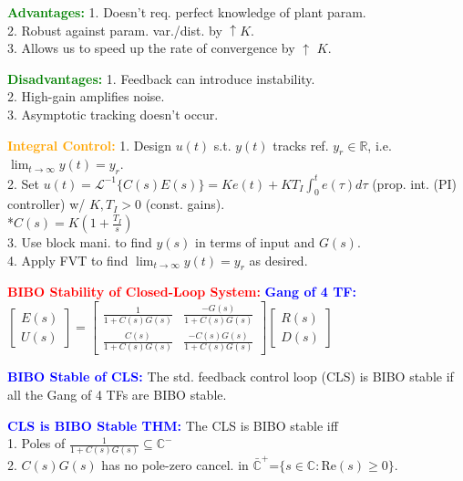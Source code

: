 \documentclass[5pt]{extarticle} %
\begin{document}
\begin{paracol}{3}
{    \textcolor{green}{\textbf{Advantages:}} 1. Doesn't req. perfect knowledge of plant param. \\
    2. Robust against param. var./dist. by $\uparrow K$. \\
    3. Allows us to speed up the rate of convergence by $\uparrow$ $K$.

    \textcolor{green}{\textbf{Disadvantages:}} 1. Feedback can introduce instability. \\
    2. High-gain amplifies noise. \\
    3. Asymptotic tracking doesn't occur. 

    \textcolor{orange}{\textbf{Integral Control:}} 1. Design $u(t)$ s.t. $y(t)$ tracks ref. $y_r \in \mathbb{R}$, i.e. $\lim_{t \rightarrow \infty} y(t) = y_r$. \\
    2. Set $u(t) = \mathcal{L}^{-1} \{C(s)E(s)\} = K e(t) + K T_I \int_0^t e(\tau) d\tau$ (prop. int. (PI) controller) w/ $K, T_I > 0$ (const. gains). \\
    *$C(s) = K \left(1 + \frac{T_I}{s}\right)$ \\
    3. Use block mani. to find $y(s)$ in terms of input and $G(s)$. \\
    4. Apply FVT to find $\lim_{t \to \infty} y(t) = y_r$ as desired. 

    \textcolor{red}{\textbf{BIBO Stability of Closed-Loop System:}} \textcolor{blue}{\textbf{Gang of 4 TF:}} \\
    $\begin{bmatrix}
        E(s) \\
        U(s)
    \end{bmatrix} =
    \begin{bmatrix}
        \frac{1}{1+C(s)G(s)} & \frac{-G(s)}{1+C(s)G(s)} \\
        \frac{C(s)}{1+C(s)G(s)} & \frac{-C(s)G(s)}{1+C(s)G(s)}
    \end{bmatrix} 
    \begin{bmatrix}
        R(s) \\
        D(s)
    \end{bmatrix}
    $ 

    \textcolor{blue}{\textbf{BIBO Stable of CLS:}} The std. feedback control loop (CLS) is BIBO stable if all the Gang of 4 TFs are BIBO stable.

    \textcolor{blue}{\textbf{CLS is BIBO Stable THM:}} The CLS is BIBO stable iff \\ 
    1. Poles of $\frac{1}{1 + C(s)G(s)} \subseteq \mathbb{C}^{-}$ \\
    2. $C(s)G(s)$ has no pole-zero cancel. in $\bar{\mathbb{C}}^{+} \text{=} \{ s \in \mathbb{C} : \text{Re}(s) \geq 0 \}$. 

}
\end{paracol}
\end{document}

